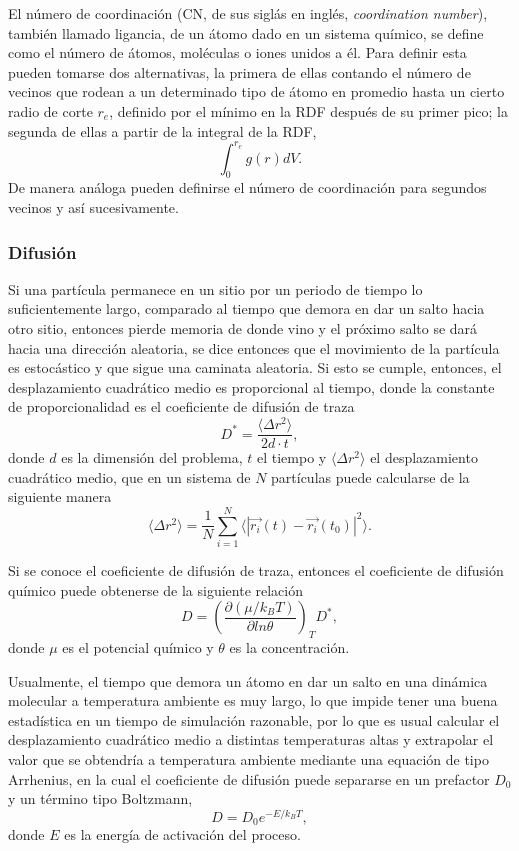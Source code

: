 El número de coordinación (CN, de sus siglás en inglés, \textit{coordination 
number}), también llamado ligancia, de un átomo dado en un sistema químico, se 
define como el número de átomos, moléculas o iones unidos a él. Para definir esta 
pueden tomarse dos alternativas, la primera de ellas contando el número de 
vecinos que rodean a un determinado tipo de átomo en promedio hasta un cierto
radio de corte $r_e$, definido por el mínimo en la RDF después de su primer pico; 
la segunda de ellas a partir de la integral de la RDF,
$$
\int_0^{r_e} g(r) dV.
$$
De manera análoga pueden definirse el número de coordinación para segundos vecinos
y así sucesivamente.

\subsubsection{Difusión}

Si una partícula permanece en un sitio por un periodo de tiempo lo suficientemente 
largo, comparado al tiempo que demora en dar un salto hacia otro sitio, entonces 
pierde memoria de donde vino y el próximo salto se dará hacia una dirección 
aleatoria, se dice entonces que el movimiento de la partícula es estocástico y 
que sigue una caminata aleatoria. Si esto se cumple, entonces, el desplazamiento 
cuadrático medio es proporcional al tiempo, donde la constante de proporcionalidad 
es el coeficiente de difusión de traza
\begin{equation}
    D^{*} = \frac{\langle \Delta r^2 \rangle}{2d\cdot t},
\end{equation}
donde $d$ es la dimensión del problema, $t$ el tiempo y 
$\langle \Delta r^2 \rangle$ el desplazamiento cuadrático medio, que en un sistema 
de $N$ partículas puede calcularse de la siguiente manera
$$
\langle \Delta r^2 \rangle = \frac{1}{N} \sum_{i=1}^{N} \langle |\vec{r_i}(t) - \vec{r_i}(t_0)|^2 \rangle.
$$

Si se conoce el coeficiente de difusión de traza, entonces el coeficiente de 
difusión químico puede obtenerse de la siguiente relación ~\cite{gomer1990}
\begin{equation}
    D = \left( \frac{\partial (\mu / k_BT)}{\partial ln \theta} \right)_T D^{*},
\end{equation}
donde $\mu$ es el potencial químico y $\theta$ es la concentración.

Usualmente, el tiempo que demora un átomo en dar un salto en una dinámica 
molecular a temperatura ambiente es muy largo, lo que impide tener una buena 
estadística en un tiempo de simulación razonable, por lo que es usual calcular 
el desplazamiento cuadrático medio a distintas temperaturas altas y extrapolar
el valor que se obtendría a temperatura ambiente mediante una equación de tipo 
Arrhenius, en la cual el coeficiente de difusión puede separarse en un 
prefactor $D_0$ y un término tipo Boltzmann,
$$
D = D_0 e^{-E / k_BT},
$$
donde $E$ es la energía de activación del proceso. 
